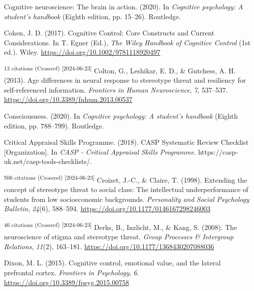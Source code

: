 \documentclass[
  stu, a4paper,floatsintext]{apa7}
\newlength{\cslhangindent}
\newenvironment{CSLReferences}[2] %
 {\begin{list}{}{%
  \setlength{\itemindent}{0pt}
  \setlength{\leftmargin}{0pt}
  \setlength{\parsep}{0pt}
  \ifodd #1
   \setlength{\leftmargin}{\cslhangindent}
   \setlength{\itemindent}{-1\cslhangindent}
  \fi
  \setlength{\itemsep}{#2\baselineskip}}}
 {\end{list}}
\begin{document}
\begin{CSLReferences}{1}{0}
Cognitive neuroscience: The brain in action. (2020). In \emph{Cognitive psychology: A student's handbook} (Eighth edition, pp. 15--26). Routledge.

Cohen, J. D. (2017). Cognitive {Control}: {Core Constructs} and {Current Considerations}. In T. Egner (Ed.), \emph{The {Wiley Handbook} of {Cognitive Control}} (1st ed.). Wiley. \url{https://doi.org/10.1002/9781118920497}

\textsuperscript{13 citations (Crossref) {[}2024-06-23{]}} Colton, G., Leshikar, E. D., \& Gutchess, A. H. (2013). Age differences in neural response to stereotype threat and resiliency for self-referenced information. \emph{Frontiers in Human Neuroscience}, \emph{7}, 537--537. \url{https://doi.org/10.3389/fnhum.2013.00537}

Consciousness. (2020). In \emph{Cognitive psychology: A student's handbook} (Eighth edition, pp. 788--799). Routledge.

Critical Appraisal Skills Programme. (2018). {CASP Systematic Review Checklist} {[}Organization{]}. In \emph{CASP - Critical Appraisal Skills Programme}. https://casp-uk.net/casp-tools-checklists/.

\textsuperscript{506 citations (Crossref) {[}2024-06-23{]}} Croizet, J.-C., \& Claire, T. (1998). Extending the concept of stereotype threat to social class: {The} intellectual underperformance of students from low socioeconomic backgrounds. \emph{Personality and Social Psychology Bulletin}, \emph{24}(6), 588--594. \url{https://doi.org/10.1177/0146167298246003}

\textsuperscript{46 citations (Crossref) {[}2024-06-23{]}} Derks, B., Inzlicht, M., \& Kang, S. (2008). The neuroscience of stigma and stereotype threat. \emph{Group Processes \& Intergroup Relations}, \emph{11}(2), 163--181. \url{https://doi.org/10.1177/1368430207088036}

Dixon, M. L. (2015). Cognitive control, emotional value, and the lateral prefrontal cortex. \emph{Frontiers in Psychology}, \emph{6}. \url{https://doi.org/10.3389/fpsyg.2015.00758}


\end{CSLReferences}
\end{document}
